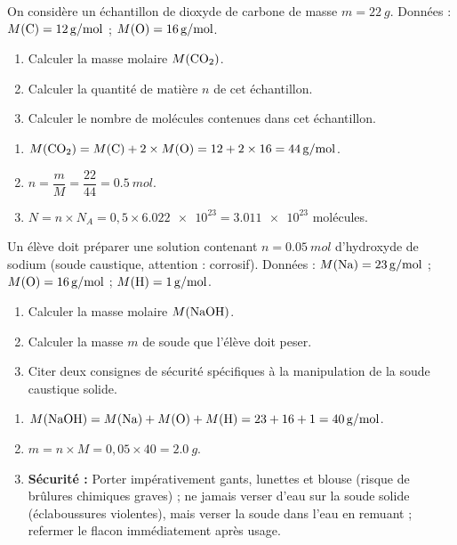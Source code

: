 \documentclass[11pt]{article}
\begin{document}
\begin{exercice}
On considère un échantillon de dioxyde de carbone  de masse $m = \SI{22}{g}$.
Données : $M(\ce{C}) = \SI{12}{g/mol}$ ; $M(\ce{O}) = \SI{16}{g/mol}$.
\begin{enumerate}
\item Calculer la masse molaire $M(\ce{CO2})$.
\item Calculer la quantité de matière $n$ de cet échantillon.
\item Calculer le nombre de molécules  contenues dans cet échantillon.
\end{enumerate}
\end{exercice}

\begin{corrige}
\begin{enumerate}
\item $M(\ce{CO2}) = M(\ce{C}) + 2 \times M(\ce{O}) = 12 + 2 \times 16 = \SI{44}{g/mol}$.
\item $n = \dfrac{m}{M} = \dfrac{22}{44} = \SI{0,5}{mol}$.
\item $N = n \times N_A = 0,5 \times \num{6,022e23} = \num{3,011e23}$ molécules.
\end{enumerate}
\end{corrige}

\begin{exercice}
Un élève doit préparer une solution contenant $n = \SI{0,05}{mol}$ d'hydroxyde de sodium  (soude caustique, attention : corrosif).
Données : $M(\ce{Na}) = \SI{23}{g/mol}$ ; $M(\ce{O}) = \SI{16}{g/mol}$ ; $M(\ce{H}) = \SI{1}{g/mol}$.
\begin{enumerate}
\item Calculer la masse molaire $M(\ce{NaOH})$.
\item Calculer la masse $m$ de soude que l'élève doit peser.
\item Citer deux consignes de sécurité spécifiques à la manipulation de la soude caustique solide.
\end{enumerate}
\end{exercice}

\begin{corrige}
\begin{enumerate}
\item $M(\ce{NaOH}) = M(\ce{Na}) + M(\ce{O}) + M(\ce{H}) = 23 + 16 + 1 = \SI{40}{g/mol}$.
\item $m = n \times M = 0,05 \times 40 = \SI{2,0}{g}$.
\item \textbf{Sécurité :} Porter impérativement gants, lunettes et blouse (risque de brûlures chimiques graves) ; ne jamais verser d'eau sur la soude solide (éclaboussures violentes), mais verser la soude dans l'eau en remuant ; refermer le flacon immédiatement après usage.
\end{enumerate}
\end{corrige}
\end{document}
